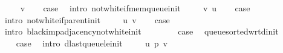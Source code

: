 \begin{isabellebody}
\isanewline
\ \ \isamarkupfalse%
\ {\isacharparenleft}{\kern0pt}{}\ v{\isacharparenright}{\kern0pt}\isanewline
\ \ \isamarkupfalse%
\ {\isacharquery}{\kern0pt}case\ \isamarkupfalse%
\ {\isacharparenleft}{\kern0pt}intro\ not{\isacharunderscore}{\kern0pt}white{\isacharunderscore}{\kern0pt}if{\isacharunderscore}{\kern0pt}mem{\isacharunderscore}{\kern0pt}queue{\isacharunderscore}{\kern0pt}init{\isacharparenright}{\kern0pt}\isanewline
{}\isamarkupfalse%
\isanewline
\ \ \isamarkupfalse%
\ {\isacharparenleft}{\kern0pt}{}\ v\ u{\isacharparenright}{\kern0pt}\isanewline
\ \ \isamarkupfalse%
\ {\isacharquery}{\kern0pt}case\ \isamarkupfalse%
\ {\isacharparenleft}{\kern0pt}intro\ not{\isacharunderscore}{\kern0pt}white{\isacharunderscore}{\kern0pt}if{\isacharunderscore}{\kern0pt}parent{\isacharunderscore}{\kern0pt}init{\isacharparenright}{\kern0pt}\isanewline
{}\isamarkupfalse%
\isanewline
\ \ \isamarkupfalse%
\ {\isacharparenleft}{\kern0pt}{}\ u\ v{\isacharparenright}{\kern0pt}\isanewline
\ \ \isamarkupfalse%
\ {\isacharquery}{\kern0pt}case\ \isamarkupfalse%
\ {\isacharparenleft}{\kern0pt}intro\ black{\isacharunderscore}{\kern0pt}imp{\isacharunderscore}{\kern0pt}adjacency{\isacharunderscore}{\kern0pt}not{\isacharunderscore}{\kern0pt}white{\isacharunderscore}{\kern0pt}init{\isacharparenright}{\kern0pt}\isanewline
{}\isamarkupfalse%
\isanewline
\ \ \isamarkupfalse%
\ {}{}\isanewline
\ \ \isamarkupfalse%
\ {\isacharquery}{\kern0pt}case\ \isamarkupfalse%
\ queue{\isacharunderscore}{\kern0pt}sorted{\isacharunderscore}{\kern0pt}wrt{\isacharunderscore}{\kern0pt}d{\isacharunderscore}{\kern0pt}init\ \isacommand{{\isachardot}{\kern0pt}}\isamarkupfalse%
\isanewline
{}\isamarkupfalse%
\isanewline
\ \ \isamarkupfalse%
\ {}{}\isanewline
\ \ \isamarkupfalse%
\ {\isacharquery}{\kern0pt}case\ \isamarkupfalse%
\ {\isacharparenleft}{\kern0pt}intro\ d{\isacharunderscore}{\kern0pt}last{\isacharunderscore}{\kern0pt}queue{\isacharunderscore}{\kern0pt}le{\isacharunderscore}{\kern0pt}init{\isacharparenright}{\kern0pt}\isanewline
{}\isamarkupfalse%
\isanewline
\ \ \isamarkupfalse%
\ {\isacharparenleft}{\kern0pt}{}{}\ u\ p\ v{\isacharparenright}{\kern0pt}\isanewline

\end{isabellebody}
